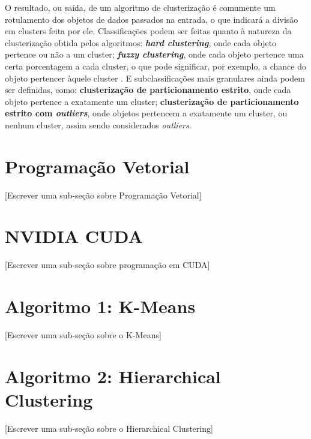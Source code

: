 \documentclass[12pt, %
openright, 
oneside, %
a4paper,    %
brazil]{facom-ufu-abntex2}
\begin{document}

O resultado, ou saída, de um algoritmo de clusterização é comumente um rotulamento dos objetos de dados passados na entrada, o que indicará a divisão em clusters feita por ele. Classificações podem ser feitas quanto à natureza da clusterização obtida pelos algoritmos: \textbf{\textit{hard clustering}}, onde cada objeto pertence ou não a um cluster; \textbf{\textit{fuzzy clustering}}, onde cada objeto pertence uma certa porcentagem a cada cluster, o que pode significar, por exemplo, a chance do objeto pertencer àquele cluster \cite{FuzzyClusteringSurvey}. E subclassificações mais granulares ainda podem ser definidas, como: \textbf{clusterização de particionamento estrito}, onde cada objeto pertence a exatamente um cluster; \textbf{clusterização de particionamento estrito com \textit{outliers}}, onde objetos pertencem a exatamente um cluster, ou nenhum cluster, assim sendo considerados \textit{outliers}.


\section{Programação Vetorial}

[Escrever uma sub-seção sobre Programação Vetorial]

\section{NVIDIA CUDA}

[Escrever uma sub-seção sobre programação em CUDA]

\section{Algoritmo 1: K-Means}

[Escrever uma sub-seção sobre o K-Means]

\section{Algoritmo 2: Hierarchical Clustering}

[Escrever uma sub-seção sobre o Hierarchical Clustering]
\end{document}
